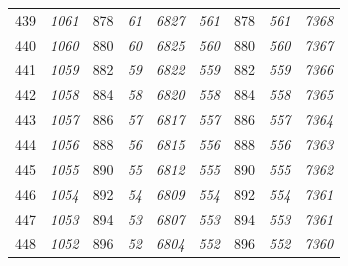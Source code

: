 \documentclass[10pt,fleqn]{article}
\begin{document}
\begin{longtable}{c|cccccccc}
439 & {\color{blue} \it 1061 \rm} & {\color{black} 878} & {\color{blue} \it 61 \rm} & {\color{blue} \it 6827 \rm} & {\color{blue} \it 561 \rm} & {\color{black} 878} & {\color{blue} \it 561 \rm} & {\color{blue} \it 7368 \rm} \\
440 & {\color{blue} \it 1060 \rm} & {\color{black} 880} & {\color{blue} \it 60 \rm} & {\color{blue} \it 6825 \rm} & {\color{blue} \it 560 \rm} & {\color{black} 880} & {\color{blue} \it 560 \rm} & {\color{blue} \it 7367 \rm} \\
441 & {\color{blue} \it 1059 \rm} & {\color{black} 882} & {\color{blue} \it 59 \rm} & {\color{blue} \it 6822 \rm} & {\color{blue} \it 559 \rm} & {\color{black} 882} & {\color{blue} \it 559 \rm} & {\color{blue} \it 7366 \rm} \\
442 & {\color{blue} \it 1058 \rm} & {\color{black} 884} & {\color{blue} \it 58 \rm} & {\color{blue} \it 6820 \rm} & {\color{blue} \it 558 \rm} & {\color{black} 884} & {\color{blue} \it 558 \rm} & {\color{blue} \it 7365 \rm} \\
443 & {\color{blue} \it 1057 \rm} & {\color{black} 886} & {\color{blue} \it 57 \rm} & {\color{blue} \it 6817 \rm} & {\color{blue} \it 557 \rm} & {\color{black} 886} & {\color{blue} \it 557 \rm} & {\color{blue} \it 7364 \rm} \\
444 & {\color{blue} \it 1056 \rm} & {\color{black} 888} & {\color{blue} \it 56 \rm} & {\color{blue} \it 6815 \rm} & {\color{blue} \it 556 \rm} & {\color{black} 888} & {\color{blue} \it 556 \rm} & {\color{blue} \it 7363 \rm} \\
445 & {\color{blue} \it 1055 \rm} & {\color{black} 890} & {\color{blue} \it 55 \rm} & {\color{blue} \it 6812 \rm} & {\color{blue} \it 555 \rm} & {\color{black} 890} & {\color{blue} \it 555 \rm} & {\color{blue} \it 7362 \rm} \\
446 & {\color{blue} \it 1054 \rm} & {\color{black} 892} & {\color{blue} \it 54 \rm} & {\color{blue} \it 6809 \rm} & {\color{blue} \it 554 \rm} & {\color{black} 892} & {\color{blue} \it 554 \rm} & {\color{blue} \it 7361 \rm} \\
447 & {\color{blue} \it 1053 \rm} & {\color{black} 894} & {\color{blue} \it 53 \rm} & {\color{blue} \it 6807 \rm} & {\color{blue} \it 553 \rm} & {\color{black} 894} & {\color{blue} \it 553 \rm} & {\color{blue} \it 7361 \rm} \\
448 & {\color{blue} \it 1052 \rm} & {\color{black} 896} & {\color{blue} \it 52 \rm} & {\color{blue} \it 6804 \rm} & {\color{blue} \it 552 \rm} & {\color{black} 896} & {\color{blue} \it 552 \rm} & {\color{blue} \it 7360 \rm} \\

\end{longtable}
\end{document}
